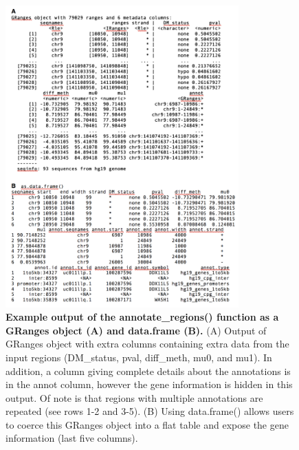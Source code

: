 \newpage

\begin{figure}[!ht]

\includegraphics[width=0.8\textwidth]{chap4tables/table4_3.png}
\caption[Example output of the annotate\_regions() function as a GRanges object (A) and data.frame (B).]
{
\textbf{Example output of the annotate\_regions() function as a GRanges object (A) and data.frame (B).}
(A) Output of GRanges object with extra columns containing extra data from the input regions (DM\_status, pval, diff\_meth, mu0, and mu1). In addition, a column giving complete details about the annotations is in the annot column, however the gene information is hidden in this output. Of note is that regions with multiple annotations are repeated (see rows 1-2 and 3-5). (B) Using data.frame() allows users to coerce this GRanges object into a flat table and expose the gene information (last five columns).
}
\label{chap4:table:3}

\end{figure}

\newpage

